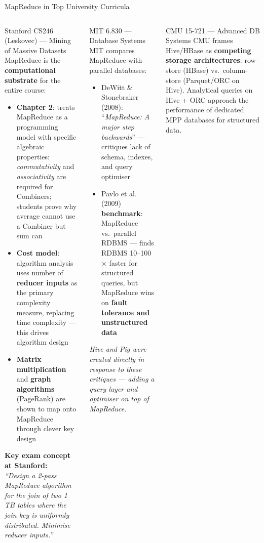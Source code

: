\documentclass[aspectratio=169,10pt]{beamer}
\begin{document}
\begin{frame}{MapReduce in Top University Curricula}
  \begin{columns}[T]
      \begin{block}{Stanford CS246 (Leskovec) — Mining of Massive Datasets}
        \small MapReduce is the \textbf{computational substrate} for the entire course:
        \begin{itemize}
          \item \textbf{Chapter 2}: treats MapReduce as a programming model with specific algebraic properties: \emph{commutativity} and \emph{associativity} are required for Combiners; students prove why average cannot use a Combiner but sum can
          \item \textbf{Cost model}: algorithm analysis uses number of \textbf{reducer inputs} as the primary complexity measure, replacing time complexity — this drives algorithm design
          \item \textbf{Matrix multiplication} and \textbf{graph algorithms} (PageRank) are shown to map onto MapReduce through clever key design
        \end{itemize}
        \textbf{Key exam concept at Stanford:}\\
        \textit{``Design a 2-pass MapReduce algorithm for the join of two 1 TB tables where the join key is uniformly distributed.  Minimise reducer inputs.''}
      \end{block}

      \begin{exampleblock}{MIT 6.830 — Database Systems}
        \small MIT compares MapReduce with parallel databases:
        \vspace{4pt}
        \begin{itemize}
          \item DeWitt \& Stonebraker (2008): ``\textit{MapReduce: A major step backwards}'' — critiques lack of schema, indexes, and query optimiser
          \item Pavlo et al. (2009) \textbf{benchmark}: MapReduce vs.\ parallel RDBMS — finds RDBMS 10--100$\times$ faster for structured queries, but MapReduce wins on \textbf{fault tolerance and unstructured data}
        \end{itemize}
        \textit{Hive and Pig were created directly in response to these critiques — adding a query layer and optimiser on top of MapReduce.}
      \end{exampleblock}
      \vspace{4pt}
      \begin{alertblock}{CMU 15-721 — Advanced DB Systems}
        \small CMU frames Hive/HBase as \textbf{competing storage architectures}: row-store (HBase) vs.\ column-store (Parquet/ORC on Hive).  Analytical queries on Hive + ORC approach the performance of dedicated MPP databases for structured data.
      \end{alertblock}
  \end{columns}
\end{frame}
\end{document}
